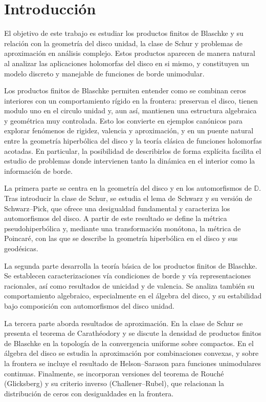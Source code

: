 \chapter*{Introducción}  %

El objetivo de este trabajo es estudiar los productos finitos de Blaschke y su relación con la geometría del disco unidad, la clase de Schur y problemas de aproximación en análisis complejo. Estos productos aparecen de manera natural al analizar las aplicaciones holomorfas del disco en si mismo, y constituyen un modelo discreto y manejable de funciones de borde unimodular.

Los productos finitos de Blaschke permiten entender como se combinan ceros interiores con un comportamiento rígido en la frontera: preservan el disco, tienen modulo uno en el circulo unidad y, aun así, mantienen una estructura algebraica y geométrica muy controlada. Esto los convierte en ejemplos canónicos para explorar fenómenos de rigidez, valencia y aproximación, y en un puente natural entre la geometría hiperbólica del disco y la teoría clásica de funciones holomorfas acotadas. En particular, la posibilidad de describirlos de forma explícita facilita el estudio de problemas donde intervienen tanto la dinámica en el interior como la información de borde.

La primera parte se centra en la geometría del disco y en los automorfismos de $\mathbb{D}$. Tras introducir la clase de Schur, se estudia el lema de Schwarz y su versión de Schwarz--Pick, que ofrece una desigualdad fundamental y caracteriza los automorfismos del disco. A partir de este resultado se define la métrica pseudohiperbólica y, mediante una transformación monótona, la métrica de Poincaré, con las que se describe la geometría hiperbólica en el disco y sus geodésicas.

La segunda parte desarrolla la teoría básica de los productos finitos de Blaschke. Se establecen caracterizaciones vía condiciones de borde y vía representaciones racionales, así como resultados de unicidad y de valencia. Se analiza también su comportamiento algebraico, especialmente en el álgebra del disco, y su estabilidad bajo composición con automorfismos del disco unidad.

La tercera parte aborda resultados de aproximación. En la clase de Schur se presenta el teorema de Carathéodory y se discute la densidad de productos finitos de Blaschke en la topología de la convergencia uniforme sobre compactos. En el álgebra del disco se estudia la aproximación por combinaciones convexas, y sobre la frontera se incluye el resultado de Helson--Sarason para funciones unimodulares continuas. Finalmente, se incorporan versiones del teorema de Rouché (Glicksberg) y su criterio inverso (Challener--Rubel), que relacionan la distribución de ceros con desigualdades en la frontera.

